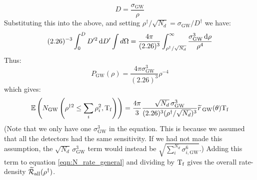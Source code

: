 \begin{equation}
\label{eqn:DtoRhoGW}
D = \frac{\sigma_{\mathrm{GW}}}{\rho}
\end{equation}
Substituting this into the above, and setting $\rho^\dagger / \sqrt{N_d} = \sigma_{\mathrm{GW}} / D^\dagger$ we have:
\begin{equation}
(2.26)^{-3} \int_{0}^{D} D'^2 \,\mathrm{d} D' \int d\Omega = \frac{4\pi}{(2.26)^3} \int_{\rho^\dagger/\sqrt{N_d}}^{\infty} \frac{\sigma_{\mathrm{GW}}^3 \,\mathrm{d}\rho}{\rho^4}
\end{equation}
Thus:
\begin{equation}
\label{eqn:GW_pdf}
P_{\mathrm{GW}}(\rho) = \frac{4\pi \sigma_{\mathrm{GW}}^3}{(2.26)^3} \rho^{-4}
\end{equation}
which gives:
\begin{equation}
\label{eqn:expectedN_GW}
\Exptd\left(N_{\mathrm{GW}} \left(\rho^{\dagger2} \leq  \sum_i\rho_i^2, \Tf \right) \right) = \frac{4\pi}{3} \frac{\sqrt{N_d}\, \sigma_{\mathrm{GW}}^3}{(2.26)^3 (\rho^\dagger/\sqrt{N_d})^3} \rsrc_{\mathrm{GW}}(\theta) \Tf 
\end{equation}
(Note that we only have one $\sigma_{\mathrm{GW}}^3$ in the equation. This is because we assumed that all the detectors had the same sensitivity. If we had not made this assumption, the $\sqrt{N_d}\,\sigma_{\mathrm{GW}}^3$ term would instead be $\sqrt{ \sum_i^{N_d} \sigma_{i,\mathrm{GW}}^6 }$.) Adding this term to equation \ref{eqn:N_rate_general} and dividing by $\mathrm{T_f}$ gives the overall rate-density $\widetilde{\mathcal{R}}_{\mathrm{all}}(\rho^\dagger)$.

